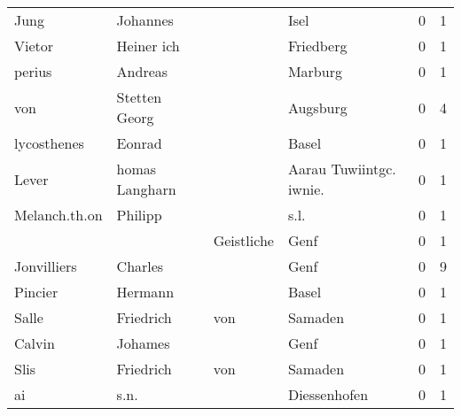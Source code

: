 \begin{tabular}{llllrr}
                     Jung &                           Johannes &             &                                        Isel &          0 &         1 \\
                   Vietor &                         Heiner ich &             &                                   Friedberg &          0 &         1 \\
                   perius &                            Andreas &             &                                     Marburg &          0 &         1 \\
                      von &                      Stetten Georg &             &                                    Augsburg &          0 &         4 \\
              lycosthenes &                             Eonrad &             &                                       Basel &          0 &         1 \\
                    Lever &                     homas Langharn &             &                    Aarau Tuwiintgc. iwnie.  &          0 &         1 \\
            Melanch.th.on &                            Philipp &             &                                        s.l. &          0 &         1 \\
                          &                                    &  Geistliche &                                        Genf &          0 &         1 \\
              Jonvilliers &                            Charles &             &                                        Genf &          0 &         9 \\
                  Pincier &                            Hermann &             &                                       Basel &          0 &         1 \\
                    Salle &                          Friedrich &         von &                                     Samaden &          0 &         1 \\
                   Calvin &                            Johames &             &                                        Genf &          0 &         1 \\
                     Slis &                          Friedrich &         von &                                     Samaden &          0 &         1 \\
                       ai &                               s.n. &             &                                Diessenhofen &          0 &         1 \\

\end{tabular}
